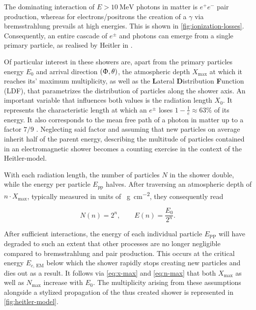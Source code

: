 The dominating interaction of $E > \SI{10}{\mega\electronvolt}$ photons in matter is $e^+e^-$ pair production, whereas for electrons/positrons the creation of a
$\gamma$ via bremsstrahlung prevails at high energies. This is shown in \autoref{fig:ionization-losses}. Consequently, an entire cascade of $e^\pm$ and photons can
emerge from a single primary particle, as realised by Heitler in \cite{heitler1984quantum}. 

Of particular interest in these showers are, apart from the primary particles energy $E_0$ and arrival direction $(\Upphi, \theta)$, the atmospheric depth 
$X_\text{max}$ at which it reaches its' maximum multiplicity, as well as the \textbf{L}ateral \textbf{D}istribution \textbf{F}unction (LDF), that parametrizes the 
distribution of particles along the shower axis. An important variable that influences both values is the radiation length $X_0$. It represents the characteristic
length at which an $e^\pm$ loses $1-\frac{1}{e}\approx63\%$ of its energy. It also corresponds to the mean free path of a photon in matter up to a factor $7 / 9$ 
\cite{gupta2010calculation}. Neglecting said factor and assuming that new particles on average inherit half of the parent energy, describing the multitude of 
particles contained in an electromagnetic shower becomes a counting exercise in the context of the Heitler-model.

With each radiation length, the number of particles $N$ in the shower double, while the energy per particle $E_\text{pp}$ halves. After traversing an atmospheric 
depth of $n\cdot X_\text{max}$, typically measured in units of \SI{}{\gram\per\centi\meter\squared}, they consequently read

\begin{equation}
\label{eq:heitler-parameters}
N(n) = 2^n, \qquad E(n) = \frac{E_0}{2^n}.
\end{equation}

After sufficient interactions, the energy of each individual particle $E_\text{PP}$ will have degraded to such an extent that other processes are no longer 
negligible compared to bremsstrahlung and pair production. This occurs at the critical energy $E_{c,\,\text{EM}}$ below which the shower rapidly stops creating new particles and
dies out as a result. It follows via \autoref{eq:x-max} and \ref{eq:n-max} that both $X_\text{max}$ as well as $N_\text{max}$ increase with $E_0$. The multiplicity 
arising from these assumptions alongside a stylized propagation of the thus created shower is represented in \autoref{fig:heitler-model}. 

